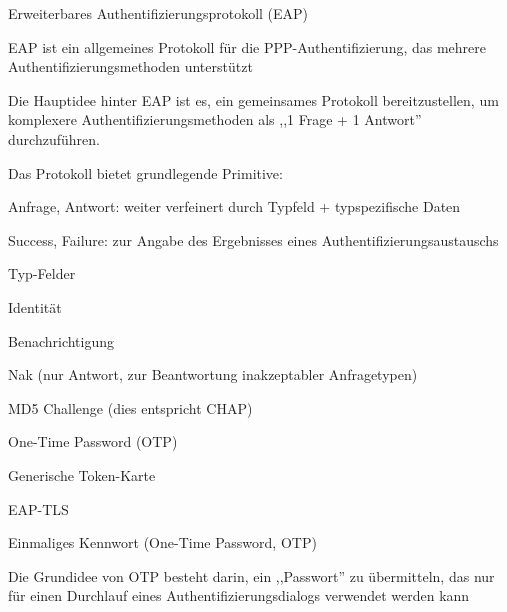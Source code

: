 \documentclass[a4paper]{article}
\begin{document}
\begin{multicols}{3}
\begin{itemize*}
\begin{itemize*}
            \end{itemize*}
            \item Erweiterbares Authentifizierungsprotokoll (EAP)
            \begin{itemize*}
                  \item EAP ist ein allgemeines Protokoll für die PPP-Authentifizierung, das mehrere Authentifizierungsmethoden unterstützt
                  \item Die Hauptidee hinter EAP ist es, ein gemeinsames Protokoll bereitzustellen, um komplexere Authentifizierungsmethoden als ,,1 Frage + 1 Antwort'' durchzuführen.
                  \item Das Protokoll bietet grundlegende Primitive:
                  \begin{itemize*}
                        \item Anfrage, Antwort: weiter verfeinert durch Typfeld + typspezifische Daten
                        \item Success, Failure: zur Angabe des Ergebnisses eines Authentifizierungsaustauschs
                  \end{itemize*}
                  \item Typ-Felder
                  \begin{itemize*}
                        \item Identität
                        \item Benachrichtigung
                        \item Nak (nur Antwort, zur Beantwortung inakzeptabler Anfragetypen)
                        \item MD5 Challenge (dies entspricht CHAP)
                        \item One-Time Password (OTP)
                        \item Generische Token-Karte
                        \item EAP-TLS
                  \end{itemize*}
            \end{itemize*}
            \item Einmaliges Kennwort (One-Time Password, OTP)
            \begin{itemize*}
                  \item Die Grundidee von OTP besteht darin, ein ,,Passwort'' zu übermitteln, das nur für einen Durchlauf eines Authentifizierungsdialogs verwendet werden kann

\end{itemize*}
\end{itemize*}
\end{multicols}
\end{document}
